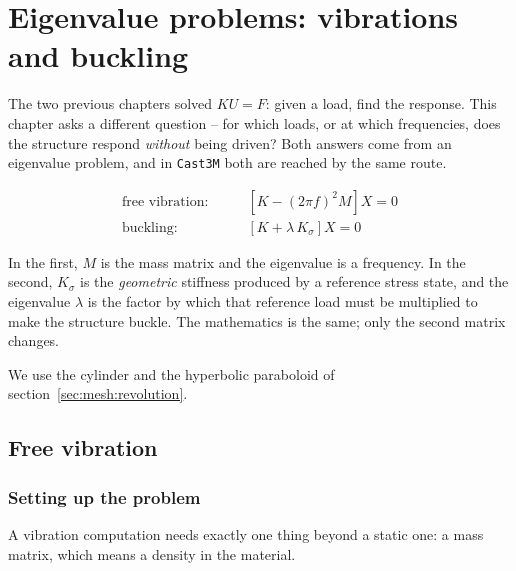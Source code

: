 \chapter{Eigenvalue problems: vibrations and buckling}
\label{chap:eigen}


The two previous chapters solved $KU=F$: given a load, find the response.
This chapter asks a different question -- for which loads, or at which
frequencies, does the structure respond \emph{without} being driven? Both
answers come from an eigenvalue problem, and in \texttt{Cast3M} both are
reached by the same route.

\begin{align}
  \text{free vibration:} \qquad & \left[K - (2\pi f)^{2} M\right] X = 0
  \label{eq:eigen:vibr} \\[1mm]
  \text{buckling:} \qquad & \left[K + \lambda\, K_{\sigma}\right] X = 0
  \label{eq:eigen:flam}
\end{align}

%
%
\noindent In the first, $M$ is the mass matrix and the eigenvalue is a
frequency. In the second, $K_{\sigma}$ is the \emph{geometric} stiffness
produced by a reference stress state, and the eigenvalue $\lambda$ is the
factor by which that reference load must be multiplied to make the structure
buckle. The mathematics is the same; only the second matrix changes.

We use the cylinder and the hyperbolic paraboloid of
section~\ref{sec:mesh:revolution}.

\section{Free vibration}

\subsection{Setting up the problem}

A vibration computation needs exactly one thing beyond a static one: a mass
matrix, which means a density in the material.

